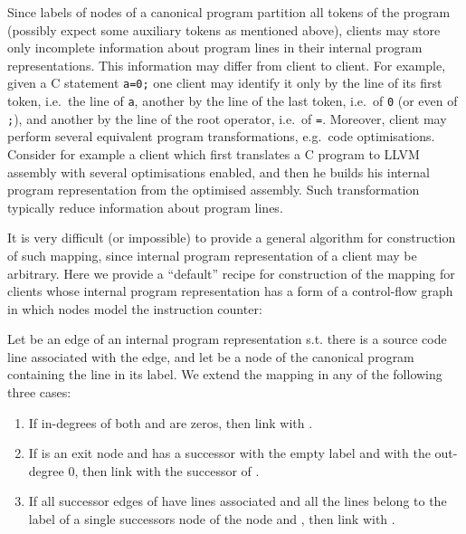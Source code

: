 \documentclass[envcountsame]{llncs}
\begin{document}
Since labels of nodes of a canonical program partition all tokens of the program
(possibly expect some auxiliary tokens as mentioned above), clients may store
only incomplete information about program lines in their internal program
representations. This information may differ from client to client. For example,
given a C statement \texttt{a=0;} one client may identify it only by the line of
its first token, i.e.~the line of \texttt{a}, another by the line of the last
token, i.e.~of \texttt{0} (or even of \texttt{;}), and another by the line of
the root operator, i.e.~of \texttt{=}. Moreover, client may perform several
equivalent program transformations, e.g.~code optimisations. Consider for
example a client which first translates a C program to LLVM assembly with
several optimisations enabled, and then he builds his internal program
representation from the optimised assembly. Such transformation typically reduce information about program lines.

It is very difficult (or impossible) to provide a general algorithm for
construction of such mapping, since internal program representation of a client
may be arbitrary. Here we provide a ``default'' recipe for construction of the
mapping for clients whose internal program representation has a form of a
control-flow graph in which nodes model the instruction counter:

Let  be an edge of an internal program representation s.t. there is a
source code line associated with the edge, and let  be a node of the
canonical program containing the line in its label. We extend the mapping in any
of the following three cases:
\begin{enumerate}
\item If in-degrees of both  and  are zeros, then link  with . \item If  is an exit node and  has a successor with the empty label
and with the out-degree 0, then link  with the successor of . \item If all successor edges of  have lines associated and all the lines
belong to the label of a single successors node  of the node  and , then link  with .
\end{enumerate}
\end{document}
